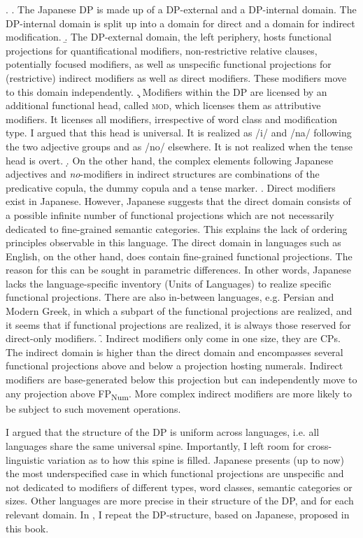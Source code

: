 \ex. \a. The Japanese DP is made up of a DP-external and a DP-internal domain. The DP-internal domain is split up into a domain for direct and a domain for indirect modification. 
\b. The DP-external domain, the left periphery, hosts functional projections for quantificational modifiers, non-restrictive relative clauses, potentially focused modifiers, as well as unspecific functional projections for (restrictive) indirect modifiers as well as direct modifiers. These modifiers move to this domain independently.
\c. Modifiers within the DP are licensed by an additional functional head, called \textsc{mod}, which licenses them as attributive modifiers. It licenses all modifiers, irrespective of word class and modification type. I argued that this head is universal. It is realized as /i/ and /na/ following the two adjective groups and as /no/ elsewhere. It is not realized when the tense head is overt.
\d. On the other hand, the complex elements following Japanese adjectives and \textit{no}-modifiers in indirect structures are combinations of the predicative copula, the dummy copula and a tense marker.
\e. Direct modifiers exist in Japanese. However, Japanese suggests that the direct domain consists of a possible infinite number of functional projections which are not necessarily dedicated to fine-grained semantic categories. This explains the lack of ordering principles observable in this language. The direct domain in languages such as English, on the other hand, does contain fine-grained functional projections. The reason for this can be sought in parametric differences. In other words, Japanese lacks the language-specific inventory (Units of Languages) to realize specific functional projections. There are also in-between languages, e.g.  Persian and  Modern Greek, in which a subpart of the functional projections are realized, and it seems that if functional projections are realized, it is always those reserved for direct-only modifiers.
\f. Indirect modifiers only come in one size, they are CPs. The indirect domain is higher than the direct domain and encompasses several functional projections above and below a projection hosting numerals. Indirect modifiers are base-generated below this projection but can independently move to any projection above FP\textsubscript{Num}. More complex indirect modifiers are more likely to be subject to such movement operations.

I argued that the structure of the DP is uniform across languages, i.e. all languages share the same universal spine. Importantly, I left room for cross-linguistic variation as to how this spine is filled. Japanese presents (up to now) the most underspecified case in which functional projections are unspecific and not dedicated to modifiers of different types, word classes, semantic categories or sizes. Other languages are more precise in their structure of the DP, and for each relevant domain. In , I repeat the DP-structure, based on Japanese, proposed in this book.



